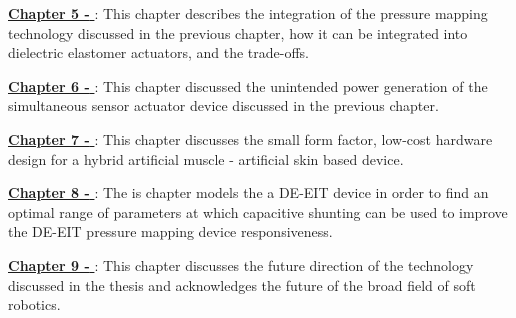 \hyperref[chapter5]{\textbf{Chapter 5 - \chapvname}}: This chapter describes the integration of the pressure mapping technology discussed in the previous chapter, how it can be integrated into dielectric elastomer actuators, and the trade-offs.

\hyperref[chapter6]{\textbf{Chapter 6 - \chapviname}}: This chapter discussed the unintended power generation of the simultaneous sensor actuator device discussed in the previous chapter.

\hyperref[chapter7]{\textbf{Chapter 7 - \chapviiname}}: This chapter discusses the small form factor, low-cost hardware design for a hybrid artificial muscle - artificial skin based device.

\hyperref[chapter8]{\textbf{Chapter 8 - \chapviiiname}}: The is chapter models the a DE-EIT device in order to find an optimal range of parameters at which capacitive shunting can be used to improve the DE-EIT pressure mapping device responsiveness.

\hyperref[chapter9]{\textbf{Chapter 9 - \chapixname}}: This chapter discusses the future direction of the technology discussed in the thesis and acknowledges the future of the broad field of soft robotics.

\afterpage{\blankpage}